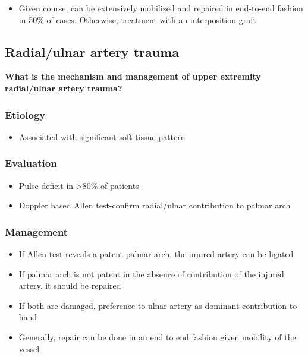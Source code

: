 \documentclass[
]{book}
\providecommand{\tightlist}{%
  \setlength{\itemsep}{0pt}\setlength{\parskip}{0pt}}
\begin{document}
\begin{itemize}
\tightlist
\item
  Given course, can be extensively mobilized and repaired in
  end-to-end fashion in 50\% of cases. Otherwise, treatment with an
  interposition graft
\end{itemize}

\hypertarget{radialulnar-artery-trauma}{%
\subsection{Radial/ulnar artery trauma}\label{radialulnar-artery-trauma}}

\textbf{What is the mechanism and management of upper extremity radial/ulnar
artery trauma?}

\hypertarget{etiology-7}{%
\subsubsection{Etiology}\label{etiology-7}}

\begin{itemize}
\tightlist
\item
  Associated with significant soft tissue pattern
\end{itemize}

\hypertarget{evaluation-8}{%
\subsubsection{Evaluation}\label{evaluation-8}}

\begin{itemize}
\item
  Pulse deficit in \textgreater80\% of patients
\item
  Doppler based Allen test-confirm radial/ulnar contribution to palmar
  arch
\end{itemize}

\hypertarget{management-9}{%
\subsubsection{Management}\label{management-9}}

\begin{itemize}
\item
  If Allen test reveals a patent palmar arch, the injured artery can
  be ligated
\item
  If palmar arch is not patent in the absence of contribution of the
  injured artery, it should be repaired
\item
  If both are damaged, preference to ulnar artery as dominant
  contribution to hand
\item
  Generally, repair can be done in an end to end fashion given
  mobility of the vessel
\end{itemize}
\end{document}
